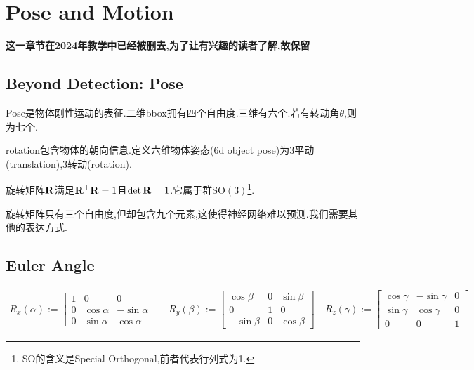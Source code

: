 \chapter{Pose and Motion}

\textbf{这一章节在2024年教学中已经被删去,为了让有兴趣的读者了解,故保留}

\section{Beyond Detection: Pose}

Pose是物体刚性运动的表征.二维bbox拥有四个自由度.三维有六个.若有转动角$\theta$,则为七个.

rotation包含物体的朝向信息.定义六维物体姿态(6d object pose)为3平动(translation),3转动(rotation).

旋转矩阵$\bold{R}$满足$\bold{R}^\top\bold{R} = 1$且$\det \bold{R} = 1$.它属于群$\mathrm{SO(3)}$\footnote{SO的含义是Special Orthogonal,前者代表行列式为1.}.

旋转矩阵只有三个自由度,但却包含九个元素,这使得神经网络难以预测.我们需要其他的表达方式.

\section{Euler Angle}
\begin{equation}
    \begin{array}{l}
        R_{x}(\alpha):=\left[\begin{array}{ccc}
            1 & 0 & 0 \\
            0 & \cos \alpha & -\sin \alpha \\
            0 & \sin \alpha & \cos \alpha
        \end{array}\right] \quad
        R_{y}(\beta):=\left[\begin{array}{ccc}
            \cos \beta & 0 & \sin \beta \\
            0 & 1 & 0 \\
            -\sin \beta & 0 & \cos \beta
        \end{array}\right] \quad
        R_{z}(\gamma):=\left[\begin{array}{ccc}
            \cos \gamma & -\sin \gamma & 0 \\
            \sin \gamma & \cos \gamma & 0 \\
            0 & 0 & 1
        \end{array}\right]
    \end{array}
\end{equation}

